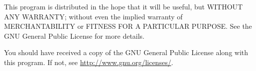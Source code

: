\documentclass[a4paper,10pt]{article}
\begin{document}
This program is distributed in the hope that it will be useful,
but WITHOUT ANY WARRANTY; without even the implied warranty of
MERCHANTABILITY or FITNESS FOR A PARTICULAR PURPOSE.  See the
GNU General Public License for more details.

You should have received a copy of the GNU General Public License
along with this program.  If not, see \url{http://www.gnu.org/licenses/}.

\clearpage






 

\end{document}
